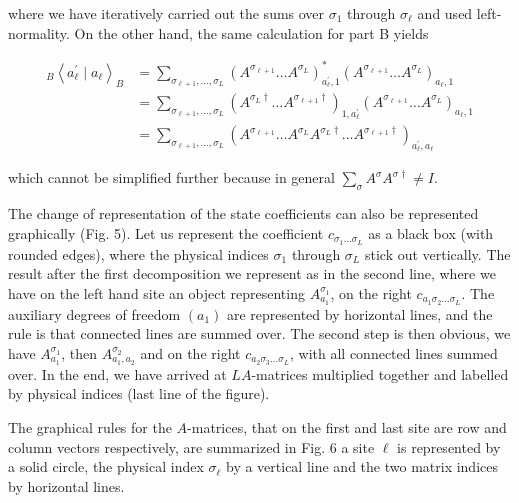 \documentclass[12pt]{article}
\begin{document}
where we have iteratively carried out the sums over $\sigma_{1}$ through $\sigma_{\ell}$ and used left-normality. On the other hand, the same calculation for part B yields

$$
\begin{aligned}
{ }_{B}\left\langle a_{\ell}^{\prime} \mid a_{\ell}\right\rangle_{B} & =\sum_{\sigma_{\ell+1}, \ldots, \sigma_{L}}\left(A^{\sigma_{\ell+1}} \ldots A^{\sigma_{L}}\right)_{a_{\ell}^{\prime}, 1}^{*}\left(A^{\sigma_{\ell+1}} \ldots A^{\sigma_{L}}\right)_{a_{\ell}, 1} \\
& =\sum_{\sigma_{\ell+1}, \ldots, \sigma_{L}}\left(A^{\sigma_{L} \dagger} \ldots A^{\sigma_{\ell+1} \dagger}\right)_{1, a_{\ell}^{\prime}}\left(A^{\sigma_{\ell+1}} \ldots A^{\sigma_{L}}\right)_{a_{\ell}, 1} \\
& =\sum_{\sigma_{\ell+1}, \ldots, \sigma_{L}}\left(A^{\sigma_{\ell+1}} \ldots A^{\sigma_{L}} A^{\sigma_{L} \dagger} \ldots A^{\sigma_{\ell+1} \dagger}\right)_{a_{\ell}^{\prime}, a_{\ell}}
\end{aligned}
$$

which cannot be simplified further because in general $\sum_{\sigma} A^{\sigma} A^{\sigma \dagger} \neq I$.

The change of representation of the state coefficients can also be represented graphically (Fig. 5). Let us represent the coefficient $c_{\sigma_{1} . . . \sigma_{L}}$ as a black box (with rounded edges), where the physical indices $\sigma_{1}$ through $\sigma_{L}$ stick out vertically. The result after the first decomposition we represent as in the second line, where we have on the left hand site an object representing $A_{a_{1}}^{\sigma_{1}}$, on the right $c_{a_{1} \sigma_{2} \ldots \sigma_{L}}$. The auxiliary degrees of freedom $\left(a_{1}\right)$ are represented by horizontal lines, and the rule is that connected lines are summed over. The second step is then obvious, we have $A_{a_{1}}^{\sigma_{1}}$, then $A_{a_{1}, a_{2}}^{\sigma_{2}}$ and on the right $c_{a_{2} \sigma_{3} . . . \sigma_{L}}$, with all connected lines summed over. In the end, we have arrived at $L A$-matrices multiplied together and labelled by physical indices (last line of the figure).

The graphical rules for the $A$-matrices, that on the first and last site are row and column vectors respectively, are summarized in Fig. 6 a site $\ell$ is represented by a solid circle, the physical index $\sigma_{\ell}$ by a vertical line and the two matrix indices by horizontal lines.
\end{document}
